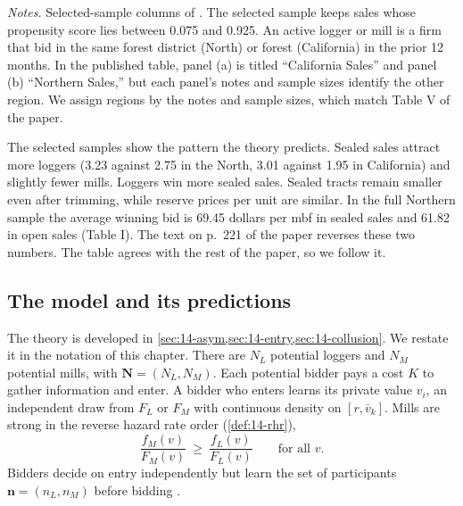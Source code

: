 \begin{table}[htbp]
\smallskip
\begin{minipage}{\linewidth}
\footnotesize\textit{Notes.} Selected-sample columns of \citet[Table I]{AtheyLevinSeira2011}. The
selected sample keeps sales whose propensity score lies between 0.075 and 0.925. An active logger or mill
is a firm that bid in the same forest district (North) or forest (California) in the prior 12 months. In
the published table, panel (a) is titled ``California Sales'' and panel (b) ``Northern Sales,'' but each
panel's notes and sample sizes identify the other region. We assign regions by the notes and sample
sizes, which match Table V of the paper.
\end{minipage}
\end{table}

The selected samples show the pattern the theory predicts. Sealed sales attract more loggers (3.23
against 2.75 in the North, 3.01 against 1.95 in California) and slightly fewer mills. Loggers win more
sealed sales. Sealed tracts remain smaller even after trimming, while reserve prices per unit are
similar. In the full Northern sample the average winning bid is 69.45 dollars per mbf in sealed sales and
61.82 in open sales (Table I).
The text on p.~221 of the paper reverses these two numbers. The table agrees with the rest of the paper,
so we follow it.

\subsection{The model and its predictions}\label{sec:15-als-theory}

The theory is developed in \cref{sec:14-asym,sec:14-entry,sec:14-collusion}. We restate it in the notation
of this chapter. There are $N_L$ potential loggers and $N_M$ potential mills, with $\bm N=(N_L,N_M)$.
Each potential bidder pays a cost $K$ to gather information and enter. A bidder who enters learns its
private value $v_i$, an independent draw from $F_L$ or $F_M$ with continuous density on $[r,\bar v_k]$.
Mills are strong in the reverse hazard rate order (\cref{def:14-rhr}),
\[
\frac{f_M(v)}{F_M(v)}\ \ge\ \frac{f_L(v)}{F_L(v)}\qquad\text{for all }v .
\]
Bidders decide on entry independently but learn the set of participants $\bm n=(n_L,n_M)$ before
bidding \citep[Section II.A]{AtheyLevinSeira2011}.


